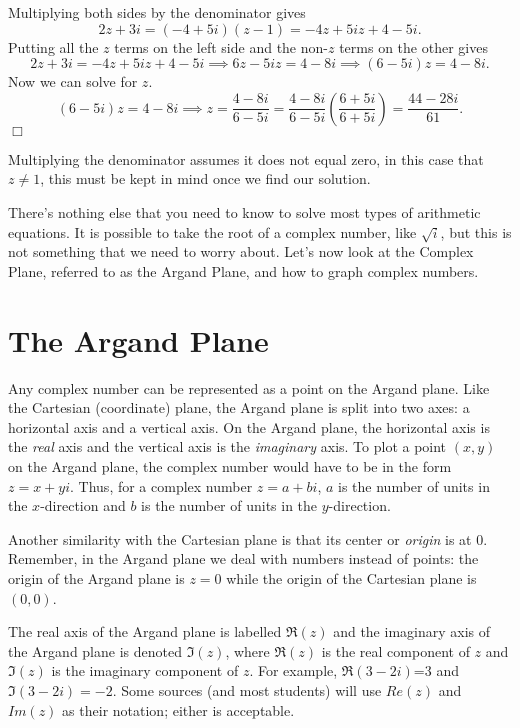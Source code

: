 \documentclass[lang=en,11pt]{elegantbook}
\begin{document}
\begin{solution}
Multiplying both sides by the denominator gives  $$2z+3i=\left(-4+5i\right)\left(z-1\right)=-4z+5iz+4-5i.$$  Putting all the $z$ terms on the left side and the non-$z$ terms on the other gives $$2z+3i=-4z+5iz+4-5i \implies 6z-5iz=4-8i \implies \left(6-5i\right)z=4-8i.$$ Now we can solve for $z$.  $$\left(6-5i\right)z=4-8i \implies z=\frac{4-8i}{6-5i}=\frac{4-8i}{6-5i}\left(\frac{6+5i}{6+5i}\right)=\frac{44-28i}{61}.$$$\Box$
\end{solution}
\begin{remark}
  Multiplying the denominator assumes it does not equal zero, in this case that $z\neq 1$, this must be kept in mind once we find our solution.
\end{remark}
\noindent There's nothing else that you need to know to solve most types of arithmetic equations.  It is possible to take the root of a complex number, like $\sqrt{i}$, but this is not something that we need to worry about.  Let's now look at the Complex Plane, referred to as the Argand Plane, and how to graph complex numbers.
\section{The Argand Plane}
\noindent Any complex number can be represented as a point on the Argand plane.  Like the Cartesian (coordinate) plane, the Argand plane is split into two axes: a horizontal axis and a vertical axis.  On the Argand plane, the horizontal axis is the \textit{real} axis and the vertical axis is the \textit{imaginary} axis.  To plot a point $(x,y)$ on the Argand plane, the complex number would have to be in the form $z=x+yi$.  Thus, for a complex number $z=a+bi$, $a$ is the number of units in the $x$-direction and $b$ is the number of units in the $y$-direction.

Another similarity with the Cartesian plane is that its center or \textit{origin} is at 0.  Remember, in the Argand plane we deal with numbers instead of points: the origin of the Argand plane is $z=0$ while the origin of the Cartesian plane is $(0,0)$.

The real axis of the Argand plane is labelled $\Re(z)$ and the imaginary axis of the Argand plane is denoted $\Im(z)$, where $\Re(z)$ is the real component of $z$ and $\Im(z)$ is the imaginary component of $z$.  For example, $\Re(3-2i)$=3 and $\Im(3-2i)=-2$.  Some sources (and most students) will use $Re(z)$ and $Im(z)$ as their notation; either is acceptable.
\end{document}
